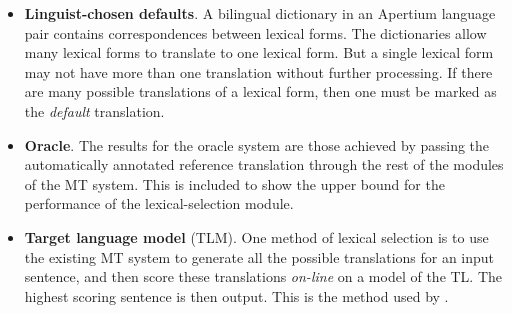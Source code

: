 \documentclass[11pt]{article}
\newcommand{\comment}[1]{\todo{#1}}
\begin{document}
\begin{itemize}
\addtolength{\itemsep}{-0.05in}
\item \textbf{Linguist-chosen defaults}. 
  A bilingual dictionary in an
  Apertium language pair contains correspondences between lexical
  forms. The dictionaries allow many lexical forms to translate to one
  lexical form. 
  But a single lexical form
  may not have more than one translation without further
  processing. If there are many possible translations of a lexical
  form, then one must be marked as the \emph{default} translation. 

\item \textbf{Oracle}.  The results for the oracle system are those
  achieved by passing the automatically annotated reference
  translation through the rest of the modules of the MT system. This
  is included to show the upper bound for the performance
  of the lexical-selection module. %

\item \textbf{Target language model} (TLM). One method of lexical
  selection is to use the existing MT system to generate all the
  possible translations for an input sentence, and then score these
  translations \emph{on-line} on a model of the TL. The highest
  scoring sentence is then output. This is the method used
  by %
  \cite{melero07a}.%
\end{itemize}
\end{document}
